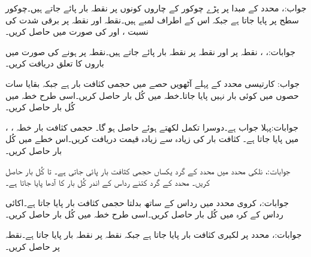 جواب:، 
محدد کے مبدا پر پڑے چوکور کے چاروں کونوں پر  نقطہ بار پائے جاتے ہیں۔چوکور  سطح پر پایا جاتا ہے جبکہ اس کے اطراف  لمبے ہیں۔نقطہ  اور نقطہ  پر برقی شدت کی نسبت  ،  اور  کی صورت میں حاصل کریں۔

جوابات:، ، 
نقطہ  پر  اور نقطہ  پر  نقطہ بار پائے جاتے ہیں۔نقطہ  پر  ہونے کی صورت میں باروں کا تعلق دریافت کریں۔ 

جواب:
کارتیسی محدد کے پہلے آٹھویں حصے  میں حجمی کثافت بار  ہے جبکہ بقایا سات حصوں میں کوئی بار نہیں پایا جاتا۔خطہ  میں کُل بار حاصل کریں۔اسی طرح خطہ  میں کُل بار حاصل کریں۔

جوابات:پہلا جواب  ہے۔دوسرا تکمل  لکھتے ہوئے  حاصل ہو گا۔ 
حجمی کثافت بار  خطہ ، ،  میں پایا جاتا ہے۔ کثافت بار کی زیادہ سے زیادہ قیمت دریافت کریں۔اس خطے میں کُل بار حاصل کریں۔

جوابات:، 
نلکی محدد میں  محدد کے گرد یکساں حجمی کثافت بار  پائی جاتی ہے۔ تا  کُل بار حاصل کریں۔ محدد کے گرد کتنے رداس کے اندر کُل بار کا آدھا پایا جاتا ہے۔

جوابات:،  
کروی محدد میں رداس کے ساتھ بدلتا حجمی کثافت بار  پایا جاتا ہے۔اکائی رداس کے کرہ میں کُل بار حاصل کریں۔اسی طرح خطہ  میں کُل بار حاصل کریں۔ 

جوابات:، 
 محدد پر  لکیری کثافت بار پایا جاتا ہے جبکہ نقطہ  پر  نقطہ بار پایا جاتا ہے۔نقطہ  پر  حاصل کریں۔

